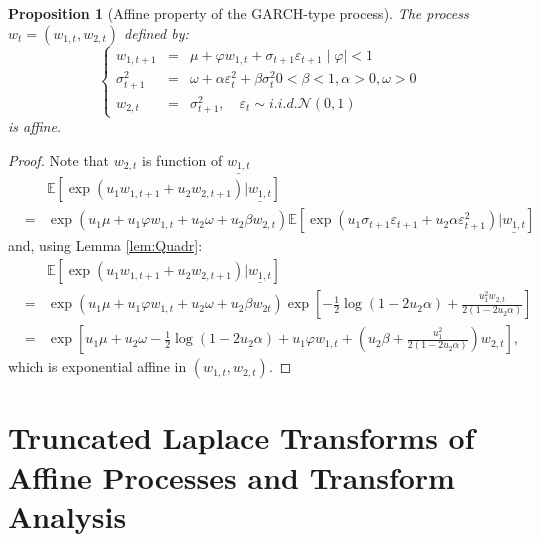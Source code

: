 \documentclass[
  12pt,
]{book}
\newtheorem{proposition}{Proposition}[chapter]
\theoremstyle{definition}
\theoremstyle{definition}
\theoremstyle{definition}
\theoremstyle{definition}
\theoremstyle{remark}
\begin{document}
\begin{proposition}[Affine property of the GARCH-type process]
\protect\hypertarget{prp:GARCH}{}\label{prp:GARCH}The process \(w_t = (w_{1,t}, w_{2,t})\) defined by:
\[
\left\{
\begin{array}{ccl}
w_{1, t+1} &=& \mu + \varphi w_{1,t} + \sigma_{t+1} \varepsilon_{t+1}    \mid \varphi \mid < 1 \\
\sigma^2_{t+1} &=& \omega + \alpha \varepsilon^2_t + \beta \sigma^2_t      0 < \beta < 1, \alpha > 0, \omega > 0    \\
w_{2,t} &=& \sigma^2_{t+1}, \quad \varepsilon_t \sim   i.i.d.   \mathcal{N}(0,1)
\end{array}
\right.
\]
is affine.
\end{proposition}

\begin{proof}
Note that \(w_{2,t}\) is function of \(\underline{w_{1,t}}\)
\begin{eqnarray*}
&& \mathbb{E}[\exp(u_1 w_{1, t+1} + u_2 w_{2, t+1})|\underline{w_{1,t}}] \\
 &= & \exp(u_1 \mu + u_1 \varphi w_{1,t} + u_2 \omega + u_2 \beta w_{2,t})  \mathbb{E}[\exp(u_1 \sigma_{t+1} \varepsilon_{t+1} + u_2 \alpha \varepsilon^2_{t+1})|\underline{w_{1,t}}]
\end{eqnarray*}
and, using Lemma \ref{lem:Quadr}:
\begin{eqnarray*}
 &&\mathbb{E}[\exp(u_1 w_{1, t+1} + u_2 w_{2, t+1})|\underline{w_{1,t}}] \\
 &= & \exp(u_1 \mu + u_1 \varphi w_{1,t} + u_2 \omega + u_2 \beta w_{2t})  \exp \left[ -   \frac{1}{2}   \log(1-2 u_2 \alpha) +
\frac{u^2_1 w_{2,t}}{2(1-2 u_2 \alpha)} \right]\\
&= & \exp \left[ u_1 \mu + u_2 \omega -  \frac{1}{2}   \log(1-2u_2\alpha)+  u_1 \varphi w_{1,t} + \left(u_2 \beta +  \frac{u^2_1}{2(1-2u_2\alpha)}\right)
w_{2,t}\right],
\end{eqnarray*}
which is exponential affine in \((w_{1,t}, w_{2,t})\).
\end{proof}

\hypertarget{TransfAna}{%
\section{Truncated Laplace Transforms of Affine Processes and Transform Analysis}\label{TransfAna}}
\end{document}
